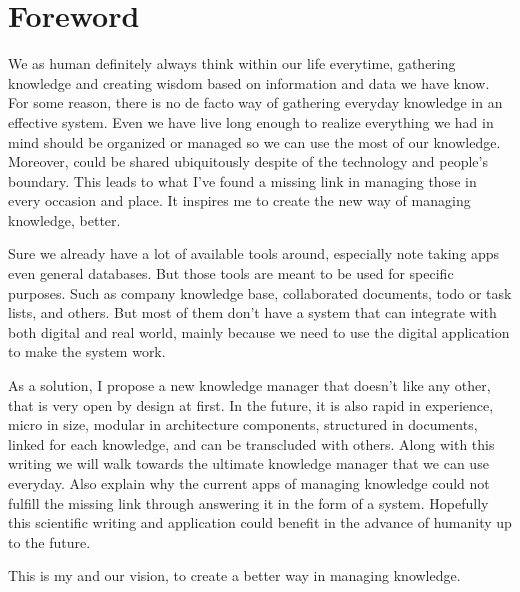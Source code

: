 \begingroup
\let\clearpage\relax
\let\cleardoublepage\relax

\chapter{Foreword}
\label{chap:foreword}

We as human definitely always think within our life everytime, gathering knowledge and creating wisdom based on information and data we have know. For some reason, there is no de facto way of gathering everyday knowledge in an effective system. Even we have live long enough to realize everything we had in mind should be organized or managed so we can use the most of our knowledge. Moreover, could be shared ubiquitously despite of the technology and people's boundary. This leads to what I've found a missing link in managing those in every occasion and place. It inspires me to create the new way of managing knowledge, better.

Sure we already have a lot of available tools around, especially note taking apps even general databases. But those tools are meant to be used for specific purposes. Such as company knowledge base, collaborated documents, todo or task lists, and others. But most of them don't have a system that can integrate with both digital and real world, mainly because we need to use the digital application to make the system work.

As a solution, I propose a new knowledge manager that doesn't like any other, that is very open by design at first. In the future, it is also rapid in experience, micro in size, modular in architecture components, structured in documents, linked for each knowledge, and can be transcluded with others. Along with this writing we will walk towards the ultimate knowledge manager that we can use everyday. Also explain why the current apps of managing knowledge could not fulfill the missing link through answering it in the form of a system. Hopefully this scientific writing and application could benefit in the advance of humanity up to the future.

This is my and our vision, to create a better way in managing knowledge.

\endgroup
